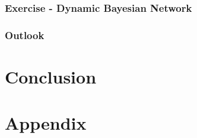 \documentclass[11pt, twoside]{article}
\numberwithin{equation}{section}
\numberwithin{table}{section}
\numberwithin{figure}{section}
\begin{document}
\subsubsection{Exercise - Dynamic Bayesian Network} \label{sssec:dbn_exercise}

\subsubsection{Outlook} \label{sssec:outlook}


%
\newpage




\thispagestyle{plain}
\section{Conclusion} \label{sec:conclusion}

\newpage







\fancyhf{}
\fancyhead[RO,LE]{\footnotesize \thepage}



\thispagestyle{plain}
\appendix
\section*{Appendix} \label{sec:appendix}

%
\newpage


\fancyhf{}
\fancyhead[LO,RE]{\footnotesize \nouppercase{\leftmark}}
\fancyhead[RO,LE]{\footnotesize \thepage}
\end{document}
